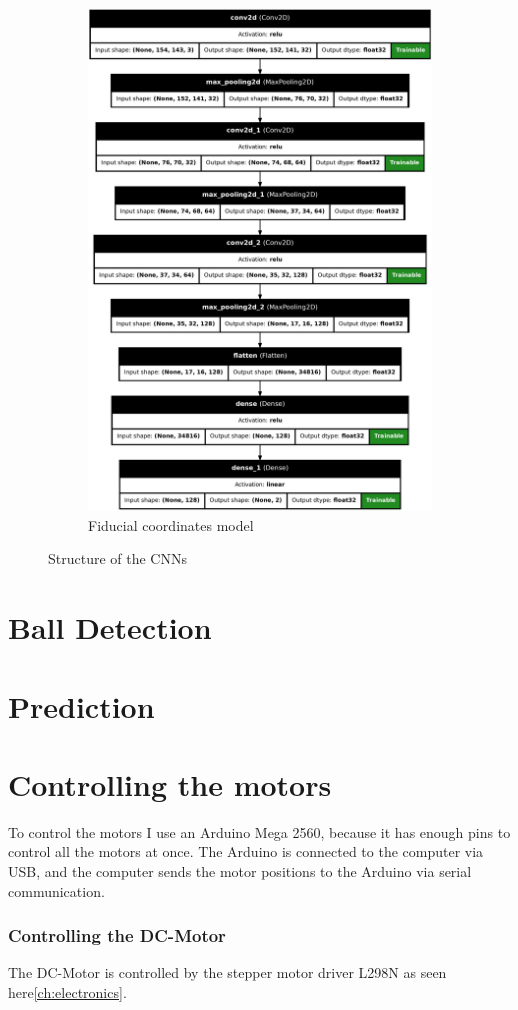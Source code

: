 \begin{figure}[H]
\begin{subfigure}{.5\textwidth}
        \includegraphics[width=.8\textwidth]{../photos/fiducial_coords_model}
        \caption[originalRainbow]{Fiducial coordinates model}
        \label{fig:fiducial_coords_model}
    \end{subfigure}
    \caption{Structure of the CNNs}
    \label{fig:CNN_structure}
\end{figure}




\section{Ball Detection}\label{sec:ball-detection}


\section{Prediction}\label{sec:prediction}


\section{Controlling the motors}\label{sec:controlling-the-motors}
To control the motors I use an Arduino Mega 2560, because it has enough pins to control all the motors at once.
The Arduino is connected to the computer via USB, and the computer sends the motor positions to the Arduino via serial communication.

\subsubsection{Controlling the DC-Motor}\label{subsubsec:controlling-the-dc-motor}
The DC-Motor is controlled by the stepper motor driver L298N as seen here\ref{ch:electronics}.



